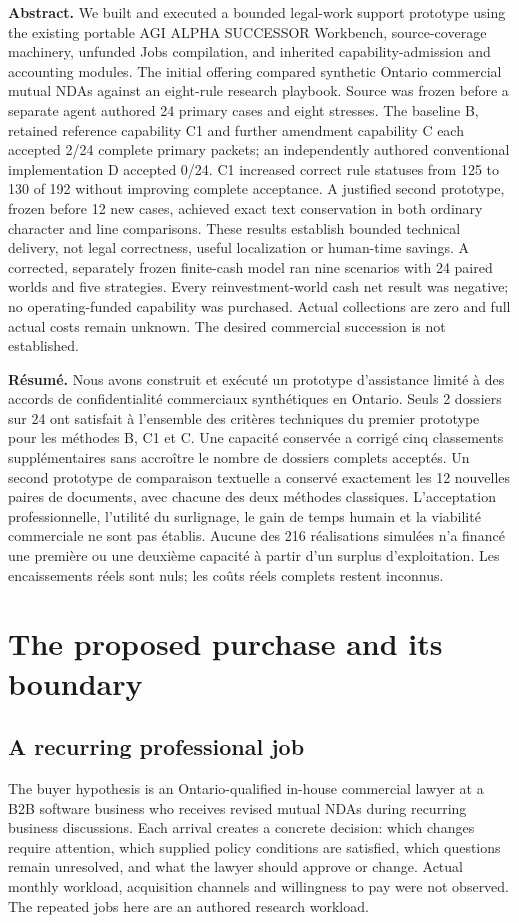\documentclass[10pt,a4paper]{article}
\begin{document}
\textbf{Abstract.} We built and executed a bounded legal-work support prototype using the existing portable AGI ALPHA SUCCESSOR Workbench, source-coverage machinery, unfunded Jobs compilation, and inherited capability-admission and accounting modules. The initial offering compared synthetic Ontario commercial mutual NDAs against an eight-rule research playbook. Source was frozen before a separate agent authored 24 primary cases and eight stresses. The baseline B, retained reference capability C1 and further amendment capability C each accepted 2/24 complete primary packets; an independently authored conventional implementation D accepted 0/24. C1 increased correct rule statuses from 125 to 130 of 192 without improving complete acceptance. A justified second prototype, frozen before 12 new cases, achieved exact text conservation in both ordinary character and line comparisons. These results establish bounded technical delivery, not legal correctness, useful localization or human-time savings. A corrected, separately frozen finite-cash model ran nine scenarios with 24 paired worlds and five strategies. Every reinvestment-world cash net result was negative; no operating-funded capability was purchased. Actual collections are zero and full actual costs remain unknown. The desired commercial succession is not established.

\textbf{Résumé.} Nous avons construit et exécuté un prototype d’assistance limité à des accords de confidentialité commerciaux synthétiques en Ontario. Seuls 2 dossiers sur 24 ont satisfait à l’ensemble des critères techniques du premier prototype pour les méthodes B, C1 et C. Une capacité conservée a corrigé cinq classements supplémentaires sans accroître le nombre de dossiers complets acceptés. Un second prototype de comparaison textuelle a conservé exactement les 12 nouvelles paires de documents, avec chacune des deux méthodes classiques. L’acceptation professionnelle, l’utilité du surlignage, le gain de temps humain et la viabilité commerciale ne sont pas établis. Aucune des 216 réalisations simulées n’a financé une première ou une deuxième capacité à partir d’un surplus d’exploitation. Les encaissements réels sont nuls; les coûts réels complets restent inconnus.

\section{The proposed purchase and its boundary}
\subsection{A recurring professional job}
The buyer hypothesis is an Ontario-qualified in-house commercial lawyer at a B2B software business who receives revised mutual NDAs during recurring business discussions. Each arrival creates a concrete decision: which changes require attention, which supplied policy conditions are satisfied, which questions remain unresolved, and what the lawyer should approve or change. Actual monthly workload, acquisition channels and willingness to pay were not observed. The repeated jobs here are an authored research workload.
\end{document}
